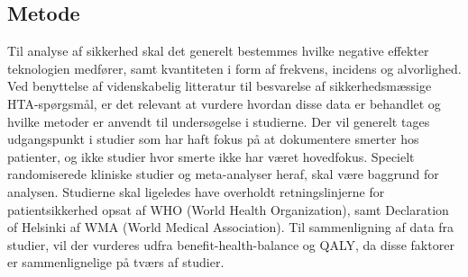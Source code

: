 \subsection{Metode \citep{HTAcore}} %
Til analyse af sikkerhed skal det generelt bestemmes hvilke negative effekter teknologien medfører, samt kvantiteten i form af frekvens, incidens og alvorlighed. Ved benyttelse af videnskabelig litteratur til besvarelse af sikkerhedsmæssige HTA-spørgsmål, er det relevant at vurdere hvordan disse data er behandlet og hvilke metoder er anvendt til undersøgelse i studierne. Der vil generelt tages udgangspunkt i studier som har haft fokus på at dokumentere smerter hos patienter, og ikke studier hvor smerte ikke har været hovedfokus. Specielt randomiserede kliniske studier og meta-analyser heraf, skal være baggrund for analysen. Studierne skal ligeledes have overholdt retningslinjerne for patientsikkerhed opsat af WHO (World Health Organization), samt Declaration of Helsinki af WMA (World Medical Association). 
Til sammenligning af data fra studier, vil der vurderes udfra benefit-health-balance og QALY, da disse faktorer er sammenlignelige på tværs af studier. 